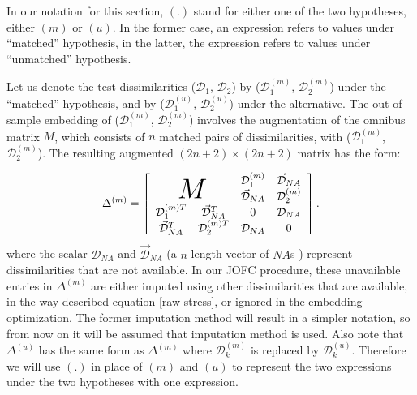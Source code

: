\documentclass[12pt,oneside,final]{thesis}\usepackage[]{graphicx}\usepackage[]{color}
\begin{document}
\begin{remark}
In our notation for this section, $(.)$  stand for either one of the two hypotheses, either $(m)$  or   $(u)$. In the former case, an expression refers to values under  ``matched'' hypothesis, in the latter, the expression refers to values under  ``unmatched''   hypothesis.
\end{remark}
Let us denote the test dissimilarities ($\mathcal{D}_1$, $\mathcal{D}_2$)  by  ($\mathcal{D}_1^{(m)}$, $\mathcal{D}_2^{(m)}$)  under the  ``matched'' hypothesis, and  by ($\mathcal{D}_1^{(u)}$, $\mathcal{D}_2^{(u)}$)  under the alternative. The out-of-sample embedding of ($\mathcal{D}_1^{(m)}$, $\mathcal{D}_2^{(m)}$) involves the  augmentation of  the omnibus matrix $M$, which consists of $n$ matched  pairs of dissimilarities,  with ($\mathcal{D}_1^{(m)}$, $\mathcal{D}_2^{(m)}$). The resulting augmented  $(2n+2)\times (2n+2)$ matrix  has the form:

 \begin{equation}
\Delta^{(m)}=  \left[ \begin{array}{cccc}
          \multicolumn{2}{c}{\multirow{2}{*}{\Huge{$M$}}} &  \mathcal{D}_1^{(m)} &\vec{\mathcal{D}}_{NA}\\
        & &  \vec{\mathcal{D}}_{NA}   & \mathcal{D}_2^{(m)} \\
  			\mathcal{D}_1^{(m)T} & \vec{\mathcal{D}}_{NA}^T  &  0 & \mathcal{D}_{NA} \\
         \vec{\mathcal{D}}_{NA}^T & \mathcal{D}_2^{(m)T} & \mathcal{D}_{NA} &0\\
     \end{array}  \right].     \label{aug_omnibus} 
\end{equation}  where
the scalar $\mathcal{D}_{NA}$ and    $\vec{\mathcal{D}}_{NA}$ (a $n$-length vector of $NA$s ) represent dissimilarities that are not available. 
In our JOFC procedure, these unavailable entries in $\Delta^{(m)}$ are either imputed using other dissimilarities that are available, in the way described  equation \eqref{raw-stress}, or ignored in the embedding optimization. The former imputation method will result in  a simpler  notation, so from now on  it will be assumed that imputation method is used. Also note that $\Delta^{(u)}$  has the same form as $\Delta^{(m)}$ where $\mathcal{D}_k^{(m)}$ is replaced by $\mathcal{D}_k^{(u)}$. Therefore we will use  $(.)$ in place of $(m)$ and $(u)$ to represent the two expressions under the two hypotheses with one expression. 
\end{document}
